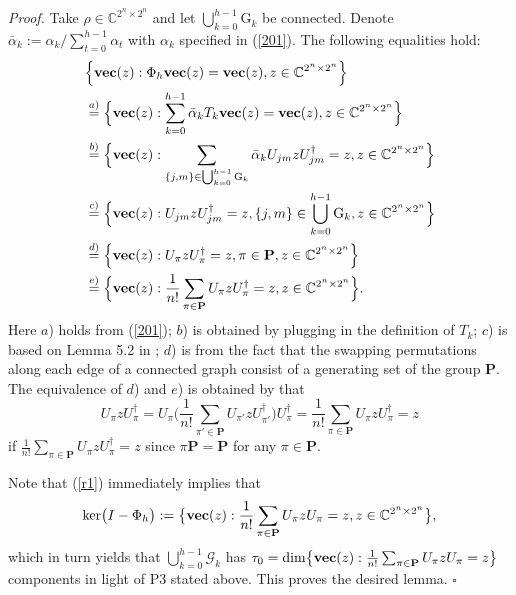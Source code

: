 \documentclass[a4paper, 11pt]{article}
\begin{document}
{\it Proof.} Take $\rho \in \mathbb{C}^{2^n\times 2^n}$ and let  $\bigcup_{k=0}^{h-1} \mathrm{G}_k$ be connected.  Denote $\bar{\alpha}_k:={\alpha_k}/{ \sum_{t=0}^{h-1}\alpha_t}$ with $\alpha_k$ specified in (\ref{201}). The following equalities hold:
\begin{align} \label{r1}
&\Big\{{\rm \bf vec}(z): \Phi_h {\rm \bf vec}(z) ={\rm \bf vec}(z), z \in\mathbb{C}^{2^n \times 2^n}\Big\}\nonumber \\
&\stackrel{a)}{=} \Big\{{\rm \bf vec}(z): \sum_{k=0}^{h-1}\bar{\alpha}_k T_k  {\rm \bf vec}(z) ={\rm \bf vec}(z), z \in\mathbb{C}^{2^n \times 2^n}\Big\}\nonumber \\
&\stackrel{b)}{=}\Big\{{\rm \bf vec}(z): \sum_{\{j,m\}\in \bigcup_{k=0}^{h-1} \mathrm{G}_k} \bar{\alpha}_k U_{jm}z U_{jm}^\dag=z,z \in\mathbb{C}^{2^n \times 2^n}\Big\}\nonumber\\
  &\stackrel{c)}{=} \Big\{{\rm \bf vec}(z): U_{jm}z U_{jm}^\dag =z, \{j,m\}\in \bigcup_{k=0}^{h-1} \mathrm{G}_k, z \in\mathbb{C}^{2^n \times 2^n}\Big\} \nonumber\\
  &\stackrel{d)}{=} \Big\{{\rm \bf vec}(z): U_\pi z U_\pi^\dag =z, \pi\in \mathbf{P}, z \in\mathbb{C}^{2^n \times 2^n}\Big\} \nonumber\\
  &\stackrel{e)}{=} \Big\{{\rm \bf vec}(z):  \frac{1}{n!} \sum_{\pi \in \mathbf{P}} U_\pi z U_\pi^\dag =z,z \in\mathbb{C}^{2^n \times 2^n}\Big\}.
  \end{align}
Here $a$) holds from (\ref{201}); $b$) is obtained by plugging in the definition of $T_k$;  $c$) is based on   Lemma 5.2 in \cite{PRAinformation}; $d$) is from the fact that the swapping permutations along each edge of a connected graph  consist of a generating set of the group $\mathbf{P}$. The equivalence of $d$) and $e$) is obtained by that
$$
U_\pi z U_\pi^\dag =U_\pi  \Big( \frac{1}{n!} \sum_{\pi' \in \mathbf{P}} U_{\pi'} z U_{\pi'}^\dag\Big)  U_\pi^\dag=\frac{1}{n!} \sum_{\pi \in \mathbf{P}} U_\pi z U_\pi^\dag=z
$$
if $\frac{1}{n!} \sum_{\pi \in \mathbf{P}} U_\pi z U_\pi^\dag=z$ since $\pi \mathbf{P}=\mathbf{P}$ for any $\pi\in \mathbf{P}$.

Note that (\ref{r1}) immediately  implies that
$$
{\rm ker}\big(I-\Phi _h\big):=\big\{{\rm \bf vec}(z):  \frac{1}{n!} \sum_{\pi \in \mathbf{P}} U_\pi z U_\pi  =z, z \in\mathbb{C}^{2^n \times 2^n}\big\},
$$
which in turn  yields that $\bigcup_{k=0}^{h-1} \mathcal{G}_k$ has $\tau_0={\rm dim} \big\{{\rm \bf vec}(z):  \frac{1}{n!} \sum_{\pi \in \mathbf{P}} U_\pi z U_\pi  =z\big\}$ components in light of P3 stated above. This proves the desired lemma. \hfill$\square$
\end{document}
